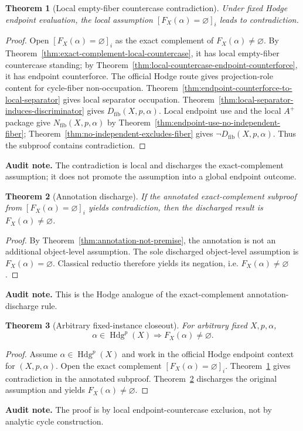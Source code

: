 \documentclass[11pt]{article}
\newtheorem{theorem}{Theorem}[section]
\newcommand{\Hdg}{\operatorname{Hdg}}
\begin{document}
\begin{theorem}[Local empty-fiber countercase contradiction]\label{thm:local-empty-fiber-contradiction}
Under fixed Hodge endpoint evaluation, the local assumption $[F_X(\alpha)=\varnothing]_i$ leads to contradiction.
\end{theorem}
\begin{proof}
Open $[F_X(\alpha)=\varnothing]_i$ as the exact complement of $F_X(\alpha)\neq\varnothing$.  By Theorem~\ref{thm:exact-complement-local-countercase}, it has local empty-fiber countercase standing; by Theorem~\ref{thm:local-countercase-endpoint-counterforce}, it has endpoint counterforce.  The official Hodge route gives projection-role content for cycle-fiber non-occupation.  Theorem~\ref{thm:endpoint-counterforce-to-local-separator} gives local separator occupation.  Theorem~\ref{thm:local-separator-induces-discriminator} gives $D_{\mathrm{fib}}(X,p,\alpha)$.  Local endpoint use and the local $A^+$ package give $N_{\mathrm{fib}}(X,p,\alpha)$ by Theorem~\ref{thm:endpoint-use-no-independent-fiber}; Theorem~\ref{thm:no-independent-excludes-fiber} gives $\neg D_{\mathrm{fib}}(X,p,\alpha)$.  Thus the subproof contains contradiction.
\end{proof}
\par\noindent\textbf{Audit note.} The contradiction is local and discharges the exact-complement assumption; it does not promote the assumption into a global endpoint outcome.

\begin{theorem}[Annotation discharge]\label{thm:annotation-discharge}
If the annotated exact-complement subproof from $[F_X(\alpha)=\varnothing]_i$ yields contradiction, then the discharged result is $F_X(\alpha)\neq\varnothing$.
\end{theorem}
\begin{proof}
By Theorem~\ref{thm:annotation-not-premise}, the annotation is not an additional object-level assumption.  The sole discharged object-level assumption is $F_X(\alpha)=\varnothing$.  Classical reductio therefore yields its negation, i.e. $F_X(\alpha)\neq\varnothing$.
\end{proof}
\par\noindent\textbf{Audit note.} This is the Hodge analogue of the exact-complement annotation-discharge rule.

\begin{theorem}[Arbitrary fixed-instance closeout]\label{thm:fixed-instance-closeout}
For arbitrary fixed $X,p,\alpha$,
\[
\alpha\in\Hdg^p(X)\Rightarrow F_X(\alpha)\neq\varnothing.
\]
\end{theorem}
\begin{proof}
Assume $\alpha\in\Hdg^p(X)$ and work in the official Hodge endpoint context for $(X,p,\alpha)$.  Open the exact complement $[F_X(\alpha)=\varnothing]_i$.  Theorem~\ref{thm:local-empty-fiber-contradiction} gives contradiction in the annotated subproof.  Theorem~\ref{thm:annotation-discharge} discharges the original assumption and yields $F_X(\alpha)\neq\varnothing$.
\end{proof}
\par\noindent\textbf{Audit note.} The proof is by local endpoint-countercase exclusion, not by analytic cycle construction.
\end{document}
